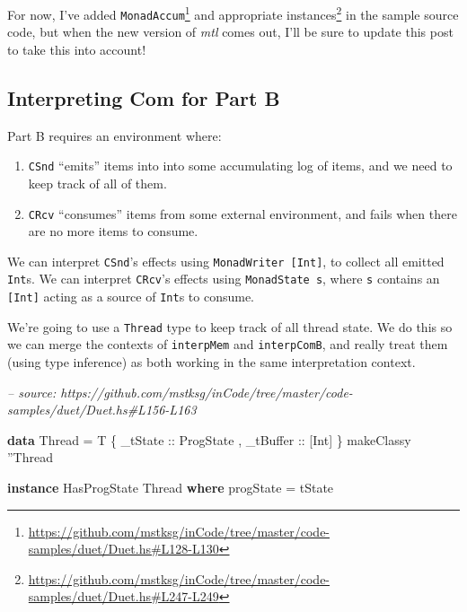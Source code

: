 \documentclass[]{article}
\newenvironment{Shaded}{}{}
\newcommand{\CharTok}[1]{\textcolor[rgb]{0.25,0.44,0.63}{#1}}
\newcommand{\CommentTok}[1]{\textcolor[rgb]{0.38,0.63,0.69}{\textit{#1}}}
\newcommand{\DataTypeTok}[1]{\textcolor[rgb]{0.56,0.13,0.00}{#1}}
\newcommand{\FunctionTok}[1]{\textcolor[rgb]{0.02,0.16,0.49}{#1}}
\newcommand{\KeywordTok}[1]{\textcolor[rgb]{0.00,0.44,0.13}{\textbf{#1}}}
\newcommand{\NormalTok}[1]{#1}
\newcommand{\OtherTok}[1]{\textcolor[rgb]{0.00,0.44,0.13}{#1}}
\renewcommand{\href}[2]{#2\footnote{\url{#1}}}
\begin{document}
For now,
\href{https://github.com/mstksg/inCode/tree/master/code-samples/duet/Duet.hs\#L128-L130}{I've
added \texttt{MonadAccum}} and
\href{https://github.com/mstksg/inCode/tree/master/code-samples/duet/Duet.hs\#L247-L249}{appropriate
instances} in the sample source code, but when the new version of \emph{mtl}
comes out, I'll be sure to update this post to take this into account!

\hypertarget{interpreting-com-for-part-b}{%
\subsection{Interpreting Com for Part B}\label{interpreting-com-for-part-b}}

Part B requires an environment where:

\begin{enumerate}
\def\labelenumi{\arabic{enumi}.}
\tightlist
\item
  \texttt{CSnd} ``emits'' items into into some accumulating log of items, and we
  need to keep track of all of them.
\item
  \texttt{CRcv} ``consumes'' items from some external environment, and fails
  when there are no more items to consume.
\end{enumerate}

We can interpret \texttt{CSnd}'s effects using \texttt{MonadWriter\ {[}Int{]}},
to collect all emitted \texttt{Int}s. We can interpret \texttt{CRcv}'s effects
using \texttt{MonadState\ s}, where \texttt{s} contains an \texttt{{[}Int{]}}
acting as a source of \texttt{Int}s to consume.

We're going to use a \texttt{Thread} type to keep track of all thread state. We
do this so we can merge the contexts of \texttt{interpMem} and
\texttt{interpComB}, and really treat them (using type inference) as both
working in the same interpretation context.

\begin{Shaded}
\begin{Highlighting}[]
\CommentTok{-- source: https://github.com/mstksg/inCode/tree/master/code-samples/duet/Duet.hs#L156-L163}

\KeywordTok{data} \DataTypeTok{Thread} \FunctionTok{=} \DataTypeTok{T}
\NormalTok{    \{}\OtherTok{ _tState   ::} \DataTypeTok{ProgState}
\NormalTok{    ,}\OtherTok{ _tBuffer  ::}\NormalTok{ [}\DataTypeTok{Int}\NormalTok{]}
\NormalTok{    \}}
\NormalTok{makeClassy }\CharTok{''}\DataTypeTok{Thread}

\KeywordTok{instance} \DataTypeTok{HasProgState} \DataTypeTok{Thread} \KeywordTok{where}
\NormalTok{    progState }\FunctionTok{=}\NormalTok{ tState}
\end{Highlighting}
\end{Shaded}
\end{document}
